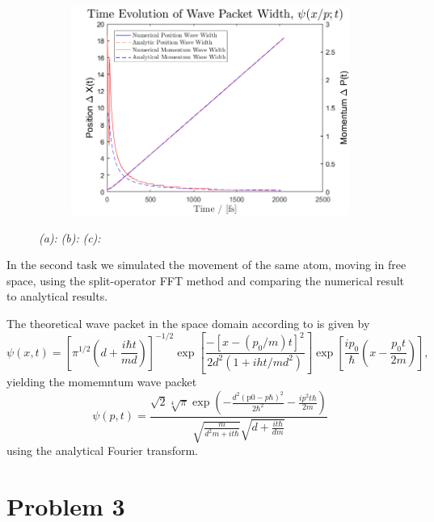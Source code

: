 \begin{figure}[H]
\begin{subfigure}[t]{0.7\textwidth}
\includegraphics[width=\textwidth]{graphics/task2/width_evolution.png}
\caption{}
\label{fig:2_c}
\end{subfigure}

\caption{
	\textit{(a):}  
	\textit{(b):} 
	\textit{(c):} 
}
\label{fig:2}
\end{figure}

In the second task we simulated the movement of the same atom, moving in free space, using the split-operator FFT method and comparing the numerical result to analytical results.

The theoretical wave packet in the space domain according to \cite{Shankar:1994} is given by
\begin{equation}
\psi(x,t) = \left[
\pi^{1/2}\left(
d+\frac{i\hbar t}{md}
\right)
\right]^{-1/2}
\exp\left[
\frac{-\left[x-\left(p_0/m\right)t\right]^2}{2d^2(1+iht/md^2)}
\right]
\exp\left[
\frac{ip_0}{\hbar}\left(x-\frac{p_0t}{2m}\right)
\right],
\end{equation}
yielding the momemntum wave packet
\begin{equation}
\psi(p,t) = \frac{\sqrt{2} \sqrt[4]{\pi } \exp \left(-\frac{d^2 (\text{p0}-p \hbar )^2}{2 \hbar ^2}-\frac{i p^2 t \hbar }{2 m}\right)}{\sqrt{\frac{m}{d^2 m+i t \hbar }} \sqrt{d+\frac{i t \hbar }{d m}}}
\end{equation}
using the analytical Fourier transform.



\section*{Problem 3}

